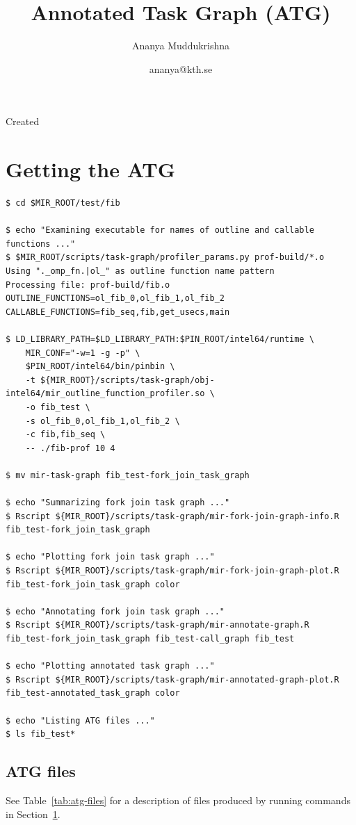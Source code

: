 \documentclass[11pt,a4paper,notitlepage]{article}
\author{Ananya Muddukrishna}
\date{ananya@kth.se}
\title{Annotated Task Graph (ATG)}
\begin{document}
\maketitle

\begin{versionhistory}
 {Created}
\end{versionhistory}

\section{Getting the ATG}
\label{sec:getting-atg}

\begin{lstlisting}[style=BashInputStyle]
$ cd $MIR_ROOT/test/fib

$ echo "Examining executable for names of outline and callable functions ..."
$ $MIR_ROOT/scripts/task-graph/profiler_params.py prof-build/*.o
Using "._omp_fn.|ol_" as outline function name pattern
Processing file: prof-build/fib.o
OUTLINE_FUNCTIONS=ol_fib_0,ol_fib_1,ol_fib_2
CALLABLE_FUNCTIONS=fib_seq,fib,get_usecs,main

$ LD_LIBRARY_PATH=$LD_LIBRARY_PATH:$PIN_ROOT/intel64/runtime \
    MIR_CONF="-w=1 -g -p" \
    $PIN_ROOT/intel64/bin/pinbin \
    -t ${MIR_ROOT}/scripts/task-graph/obj-intel64/mir_outline_function_profiler.so \
    -o fib_test \
    -s ol_fib_0,ol_fib_1,ol_fib_2 \
    -c fib,fib_seq \
    -- ./fib-prof 10 4

$ mv mir-task-graph fib_test-fork_join_task_graph

$ echo "Summarizing fork join task graph ..."
$ Rscript ${MIR_ROOT}/scripts/task-graph/mir-fork-join-graph-info.R fib_test-fork_join_task_graph 

$ echo "Plotting fork join task graph ..."
$ Rscript ${MIR_ROOT}/scripts/task-graph/mir-fork-join-graph-plot.R fib_test-fork_join_task_graph color

$ echo "Annotating fork join task graph ..."
$ Rscript ${MIR_ROOT}/scripts/task-graph/mir-annotate-graph.R fib_test-fork_join_task_graph fib_test-call_graph fib_test

$ echo "Plotting annotated task graph ..."
$ Rscript ${MIR_ROOT}/scripts/task-graph/mir-annotated-graph-plot.R fib_test-annotated_task_graph color

$ echo "Listing ATG files ..."
$ ls fib_test*
\end{lstlisting}

\subsection{ATG files}
See Table~\ref{tab:atg-files} for a description of files produced by running commands in Section~\ref{sec:getting-atg}.
\end{document}
